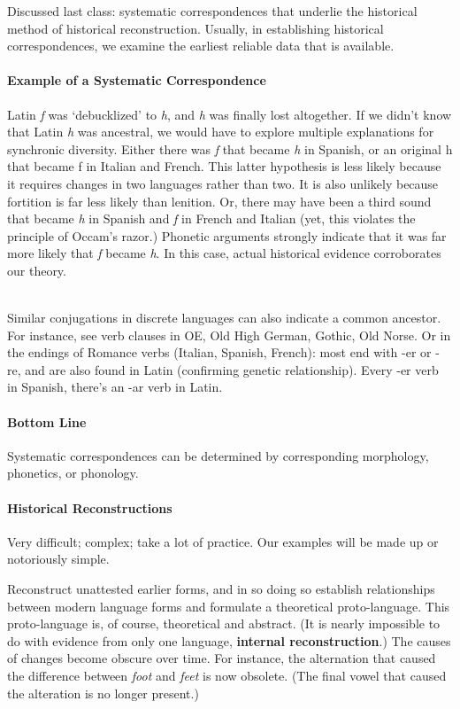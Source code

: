 \documentclass{exam}
\begin{document}
Discussed last class: systematic correspondences that underlie the historical method of historical reconstruction. 
Usually, in establishing historical correspondences, we examine the earliest reliable data that is available.  


\paragraph{Example of a Systematic Correspondence} Latin \textit{f} was `debucklized' to \textit{h}, and \textit{h} was finally lost altogether. If we didn't know that Latin \textit{h} was ancestral, we would have to explore multiple explanations for synchronic diversity. Either there was \textit{f} that became \textit{h} in Spanish, or an original h that became f in Italian and French. This latter hypothesis is less likely because it requires changes in two languages rather than two. It is also unlikely because fortition is far less likely than lenition. Or, there may have been a third sound that became \textit{h} in Spanish and \textit{f} in French and Italian (yet, this violates the principle of Occam's razor.) Phonetic arguments strongly indicate that it was far more likely that \textit{f} became \textit{h}. In this case, actual historical evidence corroborates our theory. 

\noindent \\Similar conjugations in discrete languages can also indicate a common ancestor. For instance, see verb clauses in OE, Old High German, Gothic, Old Norse. Or in the endings of Romance verbs (Italian, Spanish, French): most end with -er or -re, and are also found in Latin (confirming genetic relationship). Every -er verb in Spanish, there's an -ar verb in Latin. 

\paragraph{Bottom Line} Systematic correspondences can be determined by corresponding morphology, phonetics, or phonology.

\paragraph{Historical Reconstructions} Very difficult; complex; take a lot of practice. Our examples will be made up or notoriously simple. 

Reconstruct unattested earlier forms, and in so doing so establish relationships between modern language forms and formulate a theoretical proto-language. This proto-language is, of course, theoretical and abstract. (It is nearly impossible to do with evidence from only one language, \textbf{internal reconstruction}.) The causes of changes become obscure over time. For instance, the alternation that caused the difference between \textit{foot} and \textit{feet} is now obsolete. (The final vowel that caused the alteration is no longer present.)
\end{document}
